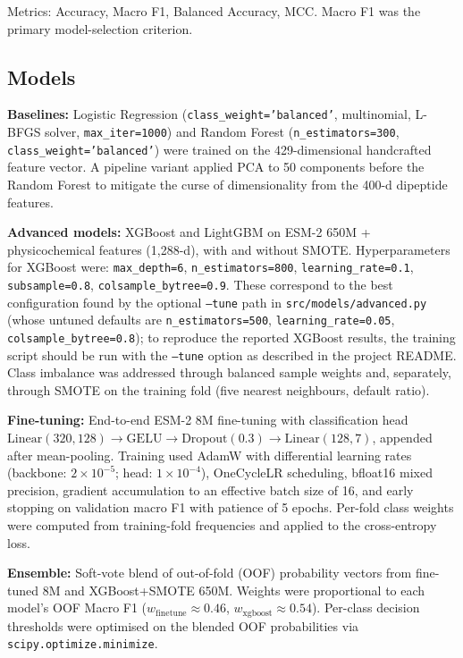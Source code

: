 \documentclass[11pt,a4paper]{article}
\begin{document}
Metrics: Accuracy, Macro F1, Balanced Accuracy, MCC.
Macro F1 was the primary model-selection criterion.

\subsection{Models}
\textbf{Baselines:} Logistic Regression (\texttt{class\_weight='balanced'}, multinomial,
L-BFGS solver, \texttt{max\_iter=1000}) and Random Forest (\texttt{n\_estimators=300},
\texttt{class\_weight='balanced'}) were trained on the 429-dimensional handcrafted feature
vector.
A pipeline variant applied PCA to 50 components before the Random Forest to mitigate the
curse of dimensionality from the 400-d dipeptide features.

\textbf{Advanced models:} XGBoost and LightGBM on ESM-2 650M + physicochemical features (1,288-d),
with and without SMOTE.
Hyperparameters for XGBoost were: \texttt{max\_depth=6}, \texttt{n\_estimators=800},
\texttt{learning\_rate=0.1}, \texttt{subsample=0.8}, \texttt{colsample\_bytree=0.9}.
These correspond to the best configuration found by the optional \texttt{--tune} path in
\texttt{src/models/advanced.py} (whose untuned defaults are \texttt{n\_estimators=500},
\texttt{learning\_rate=0.05}, \texttt{colsample\_bytree=0.8}); to reproduce the reported
XGBoost results, the training script should be run with the \texttt{--tune} option as
described in the project README.
Class imbalance was addressed through balanced sample weights and, separately, through SMOTE
on the training fold (five nearest neighbours, default ratio).

\textbf{Fine-tuning:} End-to-end ESM-2 8M fine-tuning with classification head
$\mathrm{Linear}(320,128) \to \mathrm{GELU} \to \mathrm{Dropout}(0.3) \to \mathrm{Linear}(128,7)$,
appended after mean-pooling.
Training used AdamW with differential learning rates (backbone: $2\times10^{-5}$; head: $1\times10^{-4}$),
OneCycleLR scheduling, bfloat16 mixed precision, gradient accumulation to an effective batch size
of 16, and early stopping on validation macro F1 with patience of 5 epochs.
Per-fold class weights were computed from training-fold frequencies and applied to the
cross-entropy loss.

\textbf{Ensemble:} Soft-vote blend of out-of-fold (OOF) probability vectors from fine-tuned 8M
and XGBoost+SMOTE 650M.
Weights were proportional to each model's OOF Macro F1
($w_\mathrm{finetune} \approx 0.46$, $w_\mathrm{xgboost} \approx 0.54$).
Per-class decision thresholds were optimised on the blended OOF probabilities via
\texttt{scipy.optimize.minimize}.
\end{document}

